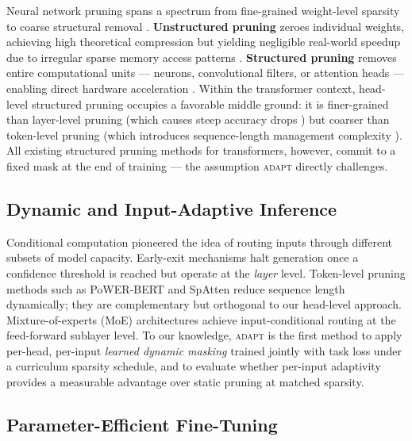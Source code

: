 \documentclass{article}
\newcommand{\system}{\textsc{adapt}}
\begin{document}
Neural network pruning spans a spectrum from fine-grained weight-level sparsity to coarse
structural removal \citep{han2015learning,molchanov2017variational}. \textbf{Unstructured
pruning} zeroes individual weights, achieving high theoretical compression but yielding
negligible real-world speedup due to irregular sparse memory access patterns
\citep{gale2019state}. \textbf{Structured pruning} removes entire computational units ---
neurons, convolutional filters, or attention heads --- enabling direct hardware acceleration
\citep{li2017pruning,michel2019sixteen}. Within the transformer context, head-level structured
pruning occupies a favorable middle ground: it is finer-grained than layer-level pruning
(which causes steep accuracy drops \citep{fan2020reducing}) but coarser than token-level
pruning (which introduces sequence-length management complexity
\citep{goyal2020power,kim2020fastformers}). All existing structured pruning methods for
transformers, however, commit to a fixed mask at the end of training --- the assumption
\system{} directly challenges.

\subsection{Dynamic and Input-Adaptive Inference}
\label{sec:bg_dynamic}

Conditional computation \citep{bengio2015conditional} pioneered the idea of routing inputs
through different subsets of model capacity. Early-exit mechanisms
\citep{graves2016adaptive,schuster2022confident} halt generation once a confidence threshold
is reached but operate at the \emph{layer} level. Token-level pruning methods such as
PoWER-BERT \citep{goyal2020power} and SpAtten \citep{wang2021spatten} reduce sequence length
dynamically; they are complementary but orthogonal to our head-level approach.
Mixture-of-experts (MoE) architectures \citep{shazeer2017outrageously,fedus2022switch}
achieve input-conditional routing at the feed-forward sublayer level. To our knowledge,
\system{} is the first method to apply per-head, per-input \emph{learned dynamic masking}
trained jointly with task loss under a curriculum sparsity schedule, and to evaluate whether
per-input adaptivity provides a measurable advantage over static pruning at matched sparsity.

\subsection{Parameter-Efficient Fine-Tuning}
\label{sec:bg_peft}
\end{document}
